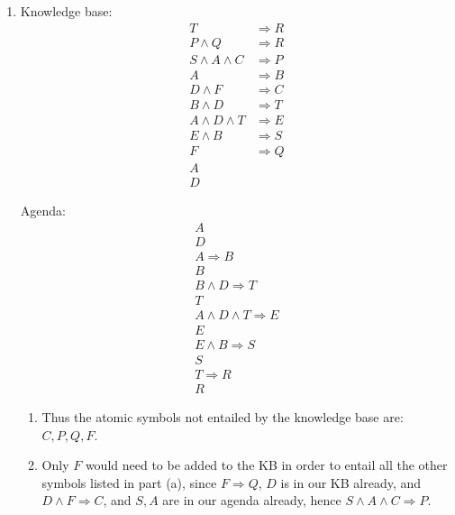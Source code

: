 \documentclass[10pt,oneside,reqno]{amsart}
\theoremstyle{plain}
\newtheorem{Prop}[Thm]{Proposition}
\theoremstyle{definition}
\begin{document}
\begin{enumerate}[label=\arabic*.]
\begin{Prop}
\end{Prop}

\item Knowledge base: 
\begin{equation}
\begin{aligned}
T &\Rightarrow R\\
P \wedge Q & \Rightarrow R\\
S \wedge A \wedge C & \Rightarrow P\\
A & \Rightarrow B\\
D \wedge F & \Rightarrow C\\
B \wedge D &\Rightarrow T\\
A \wedge D \wedge T & \Rightarrow E\\
E \wedge B &\Rightarrow S\\
F & \Rightarrow Q\\
A\\
D
\end{aligned}
\end{equation}

Agenda: 
\begin{equation}
\begin{aligned}
A\\
D\\
A  \Rightarrow B\\
B\\
B \wedge D \Rightarrow T\\
T\\
A \wedge D \wedge T  \Rightarrow E\\
E\\
E \wedge B \Rightarrow S\\
S\\
T \Rightarrow R\\
R
\end{aligned}
\end{equation}
\begin{enumerate}[label=\alph*.]


\item Thus the atomic symbols not entailed by the knowledge base are: $C,P,Q,F$. 

\item Only $F$ would need to be added to the KB in order to entail all the other symbols listed in part (a), since $F \Rightarrow Q$, $D$ is in our KB already, and $D \wedge F \Rightarrow C$, and $S,A$ are in our agenda already, hence $S \wedge A \wedge C \Rightarrow P$. 

\end{enumerate}


\end{enumerate}
\end{document}

